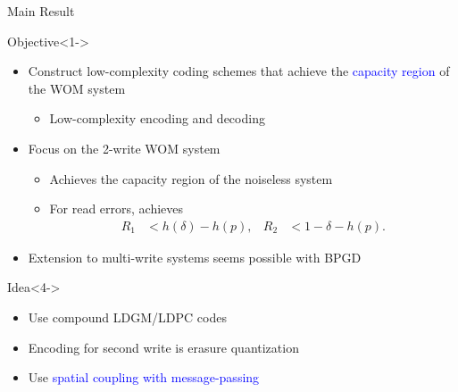 \documentclass[10pt]{beamer}
\begin{document}
\begin{frame}{Main Result}
  \begin{block}{Objective}<1->
    \begin{itemize}
    \item Construct \alert{low-complexity} coding schemes that achieve the \textcolor{blue}{capacity region} of the WOM system\vspace{0.1cm}
      \begin{itemize}
      \item<1-> Low-complexity encoding and decoding
      \end{itemize}
    \item<2-> Focus on the 2-write WOM system
      \begin{itemize}
      \item Achieves the capacity region of the noiseless system
      \item For read errors, achieves
        \begin{align*}
          R_1 &< h(\delta) - h(p), & R_2 &< 1 - \delta - h(p) .
        \end{align*}
      \end{itemize}
    \item<3-> Extension to multi-write systems \alert{seems possible with BPGD}
    \end{itemize}
  \end{block}
  \begin{block}{Idea}<4->
    \begin{itemize}
      \item Use compound LDGM/LDPC codes
      \item Encoding for second write is \alert{erasure quantization}
      \item Use \textcolor{blue}{spatial coupling with message-passing}
    \end{itemize}
  \end{block}
\end{frame}
\end{document}

